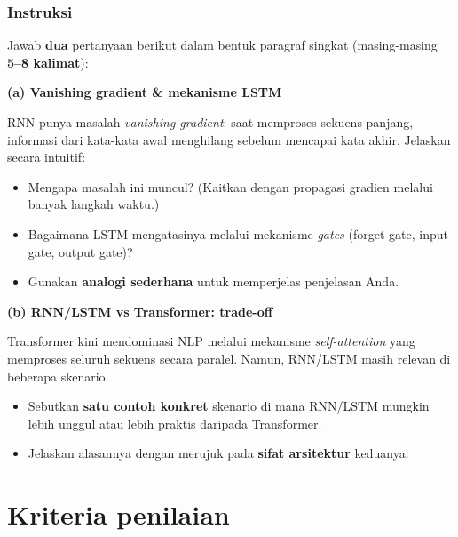 \documentclass[12pt, a4paper]{article}
\begin{document}
\subsubsection{Instruksi}
\label{sec:soal6-instruksi}

Jawab \textbf{dua} pertanyaan berikut dalam bentuk paragraf singkat (masing-masing \textbf{5--8 kalimat}):

\begin{callout}[ctpLavender]
\textbf{\color{ctpLavender}(a) Vanishing gradient \& mekanisme LSTM}\par\vspace{2pt}
RNN punya masalah \emph{vanishing gradient}: saat memproses sekuens panjang, informasi dari kata-kata awal menghilang sebelum mencapai kata akhir. Jelaskan secara intuitif:
\begin{itemize}
  \item Mengapa masalah ini muncul? (Kaitkan dengan propagasi gradien melalui banyak langkah waktu.)
  \item Bagaimana LSTM mengatasinya melalui mekanisme \emph{gates} (forget gate, input gate, output gate)?
  \item Gunakan \textbf{analogi sederhana} untuk memperjelas penjelasan Anda.
\end{itemize}
\end{callout}

\begin{callout}[ctpLavender]
\textbf{\color{ctpLavender}(b) RNN/LSTM vs Transformer: trade-off}\par\vspace{2pt}
Transformer kini mendominasi NLP melalui mekanisme \emph{self-attention} yang memproses seluruh sekuens secara paralel. Namun, RNN/LSTM masih relevan di beberapa skenario.
\begin{itemize}
  \item Sebutkan \textbf{satu contoh konkret} skenario di mana RNN/LSTM mungkin lebih unggul atau lebih praktis daripada Transformer.
  \item Jelaskan alasannya dengan merujuk pada \textbf{sifat arsitektur} keduanya.
\end{itemize}
\end{callout}

\clearpage
\section{Kriteria penilaian}\label{sec:evaluation}
\end{document}
